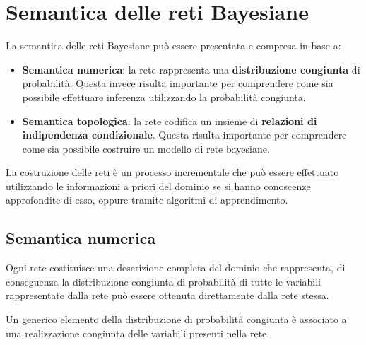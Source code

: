 \section{Semantica delle reti Bayesiane}
La semantica delle reti Bayesiane può essere presentata e compresa in base a:
\begin{itemize}
    \item \textbf{Semantica numerica}: la rete rappresenta una \textbf{distribuzione
              congiunta} di probabilità. Questa invece risulta importante per
          comprendere come sia possibile effettuare inferenza utilizzando la
          probabilità congiunta.
    \item \textbf{Semantica topologica}: la rete codifica un insieme di
          \textbf{relazioni di indipendenza condizionale}. Questa risulta
          importante per comprendere come sia possibile costruire un modello di
          rete bayesiane.
\end{itemize}
La costruzione delle reti è un processo incrementale che può essere effettuato
utilizzando le informazioni a priori del dominio se si hanno conoscenze
approfondite di esso, oppure tramite algoritmi di apprendimento.
\subsection{Semantica numerica}
Ogni rete costituisce una descrizione completa del dominio che rappresenta, di
conseguenza la distribuzione congiunta di probabilità di tutte le variabili
rappresentate dalla rete può essere ottenuta direttamente dalla rete stessa.

Un generico elemento della distribuzione di probabilità congiunta è associato a
una realizzazione congiunta delle variabili presenti nella rete.

